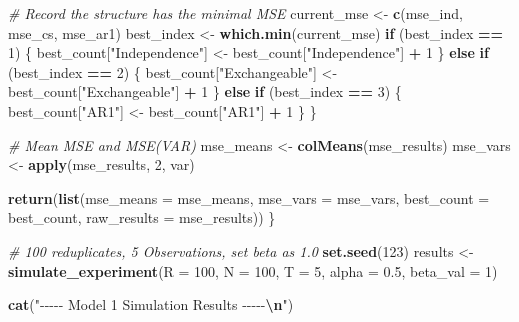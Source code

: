 \documentclass[
]{article}
\newenvironment{Shaded}{\begin{snugshade}}{\end{snugshade}}
\newcommand{\AttributeTok}[1]{\textcolor[rgb]{0.13,0.29,0.53}{#1}}
\newcommand{\CommentTok}[1]{\textcolor[rgb]{0.56,0.35,0.01}{\textit{#1}}}
\newcommand{\ControlFlowTok}[1]{\textcolor[rgb]{0.13,0.29,0.53}{\textbf{#1}}}
\newcommand{\DecValTok}[1]{\textcolor[rgb]{0.00,0.00,0.81}{#1}}
\newcommand{\FloatTok}[1]{\textcolor[rgb]{0.00,0.00,0.81}{#1}}
\newcommand{\FunctionTok}[1]{\textcolor[rgb]{0.13,0.29,0.53}{\textbf{#1}}}
\newcommand{\NormalTok}[1]{#1}
\newcommand{\OtherTok}[1]{\textcolor[rgb]{0.56,0.35,0.01}{#1}}
\newcommand{\SpecialCharTok}[1]{\textcolor[rgb]{0.81,0.36,0.00}{\textbf{#1}}}
\newcommand{\StringTok}[1]{\textcolor[rgb]{0.31,0.60,0.02}{#1}}
\begin{document}
\begin{Shaded}
\begin{Highlighting}[]
    \CommentTok{\# Record the structure has the minimal MSE}
\NormalTok{    current\_mse }\OtherTok{\textless{}{-}} \FunctionTok{c}\NormalTok{(mse\_ind, mse\_cs, mse\_ar1)}
\NormalTok{    best\_index }\OtherTok{\textless{}{-}} \FunctionTok{which.min}\NormalTok{(current\_mse)}
    \ControlFlowTok{if}\NormalTok{ (best\_index }\SpecialCharTok{==} \DecValTok{1}\NormalTok{) \{}
\NormalTok{      best\_count[}\StringTok{"Independence"}\NormalTok{] }\OtherTok{\textless{}{-}}\NormalTok{ best\_count[}\StringTok{"Independence"}\NormalTok{] }\SpecialCharTok{+} \DecValTok{1}
\NormalTok{    \} }\ControlFlowTok{else} \ControlFlowTok{if}\NormalTok{ (best\_index }\SpecialCharTok{==} \DecValTok{2}\NormalTok{) \{}
\NormalTok{      best\_count[}\StringTok{"Exchangeable"}\NormalTok{] }\OtherTok{\textless{}{-}}\NormalTok{ best\_count[}\StringTok{"Exchangeable"}\NormalTok{] }\SpecialCharTok{+} \DecValTok{1}
\NormalTok{    \} }\ControlFlowTok{else} \ControlFlowTok{if}\NormalTok{ (best\_index }\SpecialCharTok{==} \DecValTok{3}\NormalTok{) \{}
\NormalTok{      best\_count[}\StringTok{"AR1"}\NormalTok{] }\OtherTok{\textless{}{-}}\NormalTok{ best\_count[}\StringTok{"AR1"}\NormalTok{] }\SpecialCharTok{+} \DecValTok{1}
\NormalTok{    \}}
\NormalTok{  \}}
  
  \CommentTok{\# Mean MSE and MSE(VAR)}
\NormalTok{  mse\_means }\OtherTok{\textless{}{-}} \FunctionTok{colMeans}\NormalTok{(mse\_results)}
\NormalTok{  mse\_vars  }\OtherTok{\textless{}{-}} \FunctionTok{apply}\NormalTok{(mse\_results, }\DecValTok{2}\NormalTok{, var)}
  
  \FunctionTok{return}\NormalTok{(}\FunctionTok{list}\NormalTok{(}\AttributeTok{mse\_means =}\NormalTok{ mse\_means, }\AttributeTok{mse\_vars =}\NormalTok{ mse\_vars, }\AttributeTok{best\_count =}\NormalTok{ best\_count, }\AttributeTok{raw\_results =}\NormalTok{ mse\_results))}
\NormalTok{\}}

\CommentTok{\# 100 reduplicates, 5 Observations, set beta as 1.0}
\FunctionTok{set.seed}\NormalTok{(}\DecValTok{123}\NormalTok{)}
\NormalTok{results }\OtherTok{\textless{}{-}} \FunctionTok{simulate\_experiment}\NormalTok{(}\AttributeTok{R =} \DecValTok{100}\NormalTok{, }\AttributeTok{N =} \DecValTok{100}\NormalTok{, }\AttributeTok{T =} \DecValTok{5}\NormalTok{, }\AttributeTok{alpha =} \FloatTok{0.5}\NormalTok{, }\AttributeTok{beta\_val =} \DecValTok{1}\NormalTok{)}

\FunctionTok{cat}\NormalTok{(}\StringTok{"{-}{-}{-}{-}{-} Model 1 Simulation Results {-}{-}{-}{-}{-}}\SpecialCharTok{\textbackslash{}n}\StringTok{"}\NormalTok{)}
\end{Highlighting}
\end{Shaded}
\end{document}
